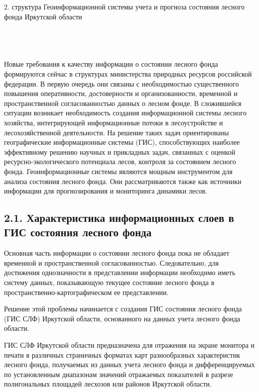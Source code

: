 \documentclass{report}
\begin{document}
2. структура Геоинформационной системы учета и прогноза состояния лесного фонда Иркутской области

\subsection[\ \ ]{\ \ }
Новые требования к качеству информации о состоянии лесного фонда формируются сейчас в структурах министерства природных
ресурсов российской федерации.  В первую очередь они связаны с необходимостью существенного повышения оперативности,
достоверности и организованности, временной и пространственной согласованностью данных о лесном фонде. В сложившейся
ситуации возникает необходимость создания информационной системы лесного хозяйства, интегрирующей информационные потоки
в лесоустройстве и лесохозяйственной деятельности. На решение таких задач ориентированы географические информационные
системы (ГИС), способствующих наиболее эффективному решению научных и прикладных задач, связанных с оценкой
ресурсно-экологического потенциала лесов, контроля за состоянием лесного фонда. Геоинформационные системы являются
мощным инструментом для анализа состояния лесного фонда. Они рассматриваются также как источники информации для
прогнозирования и мониторинга динамики лесов. 

\subsection[2.1. Характеристика информационных слоев в ГИС состояния \ лесного фонда]{2.1. Характеристика информационных
слоев в ГИС состояния  лесного фонда}
Основная часть информации о состоянии лесного фонда пока не обладает временной и пространственной согласованностью.
Следовательно, для достижения однозначности в представлении информации необходимо иметь систему данных, показывающую
текущее состояние лесного фонда в пространственно-картографическом ее представлении. 

Решение этой проблемы начинается с создания ГИС состояния лесного фонда (ГИС СЛФ) Иркутской области, основанного на
данных учета лесного фонда области. 

ГИС СЛФ Иркутской области предназначена для отражения на экране монитора и печати в различных страничных форматах карт
разнообразных характеристик лесного фонда, получаемых из данных учета лесного фонда  и дифференцируемых по
установленным диапазонам значений отражаемых показателей в разрезе полигональных площадей лесхозов или районов
Иркутской области.
\end{document}
